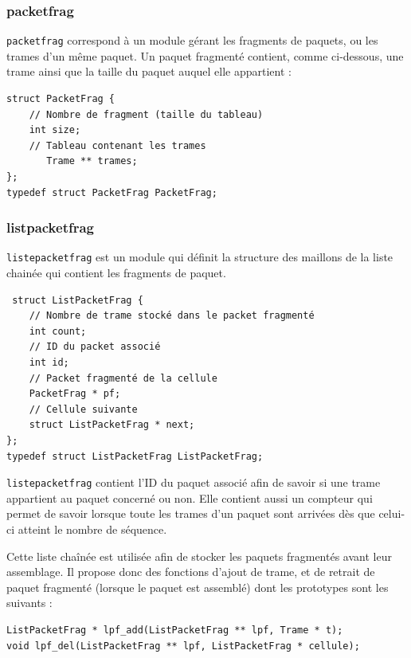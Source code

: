 \documentclass[a4paper,11pt]{article}
\begin{document}
\subsubsection{packetfrag}
\texttt{packetfrag} correspond à un module gérant les fragments de paquets,
ou les trames d'un même paquet. Un paquet fragmenté contient, comme ci-dessous, 
une trame ainsi que la taille du paquet auquel elle appartient :
\begin{verbatim}
struct PacketFrag {
    // Nombre de fragment (taille du tableau)
    int size;
    // Tableau contenant les trames
       Trame ** trames;
};
typedef struct PacketFrag PacketFrag;
\end{verbatim}


\subsubsection{listpacketfrag}
\texttt{listepacketfrag} est un module qui définit la structure des
maillons de la liste chainée qui contient les fragments de paquet.
\begin{verbatim}
 struct ListPacketFrag {
    // Nombre de trame stocké dans le packet fragmenté
    int count;
    // ID du packet associé
    int id;
    // Packet fragmenté de la cellule
    PacketFrag * pf;
    // Cellule suivante
    struct ListPacketFrag * next;
};
typedef struct ListPacketFrag ListPacketFrag;
\end{verbatim}
\texttt{listepacketfrag} contient l'ID du paquet associé afin de savoir
si une trame appartient au paquet concerné ou non. Elle contient aussi
un compteur qui permet de savoir lorsque toute les trames d'un paquet
sont arrivées dès que celui-ci atteint le nombre de séquence.

Cette liste chaînée est utilisée afin de stocker les paquets fragmentés
avant leur assemblage. Il propose donc des fonctions d'ajout de trame,
et de retrait de paquet fragmenté (lorsque le paquet est assemblé) dont
les prototypes sont les suivants :
\begin{verbatim}
ListPacketFrag * lpf_add(ListPacketFrag ** lpf, Trame * t);
void lpf_del(ListPacketFrag ** lpf, ListPacketFrag * cellule);
\end{verbatim}
\end{document}
